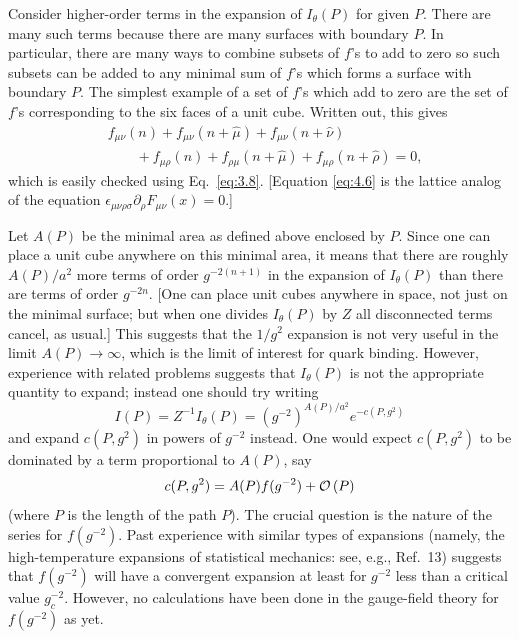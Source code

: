 Consider higher-order terms in the expansion of $I_{\theta}(P)$ for
given $P$.  There are many such terms because there are many surfaces
with boundary $P$.  In particular, there are many ways to combine subsets
of $f$'s to add to zero so such subsets can be added to any minimal sum
of $f$'s which forms a surface with boundary $P$.  The simplest example
of a set of $f$'s which add to zero are the set of $f$'s corresponding
to the six faces of a unit cube.  Written out, this gives
\begin{equation}
\begin{split}
&f_{\mu\nu}(n)+f_{\mu\nu}(n+\hat\mu)+f_{\mu\nu}(n+\hat\nu)\\
&\qquad + f_{\mu\rho}(n)+f_{\rho\mu}(n+\hat\mu)+f_{\mu\rho}(n+\hat\rho)=0,
\end{split}
\label{eq:4.6}
\end{equation}
which is easily checked using Eq.~\eqref{eq:3.8}.  [Equation
\eqref{eq:4.6} is the lattice analog of the equation
$\epsilon_{\mu\nu\rho\sigma}\partial_{\rho}F_{\mu\nu}(x)=0$.]

Let $A(P)$ be the minimal area as defined above enclosed by $P$.  Since
one can place a unit cube anywhere on this minimal area, it means that
there are roughly $A(P)/a^{2}$ more terms of order $g^{-2(n+1)}$ in the
expansion of $I_{\theta}(P)$ than there are terms of order $g^{-2n}$.
[One can place unit cubes anywhere in space, not just on the minimal
surface; but when one divides $I_{\theta}(P)$ by $Z$ all disconnected
terms cancel, as usual.]  This suggests that the $1/g^{2}$ expansion is
not very useful in the limit $A(P) \to \infty$, which is the limit of
interest for quark binding.  However, experience with related problems
suggests that $I_{\theta}(P)$ is not the appropriate quantity to expand;
instead one should try writing
\[
I(P) = Z^{-1}I_{\theta}(P) = (g^{-2})^{A(P)/a^{2}}e^{-c(P,g^{2})}
\]
and expand $c(P,g^{2})$ in powers of $g^{-2}$ instead.  One would expect
$c(P,g^{2})$ to be dominated by a term proportional to $A(P)$, say
\[
c(P,g^{2}) = A(P)f(g^{-2}) + \mathcal{O}\left(P\right)
\]
(where $P$ is the length of the path $P$).  The crucial question is the
nature of the series for $f(g^{-2})$.  Past experience with similar types
of expansions (namely, the high-temperature expansions of statistical
mechanics:  see, e.g., Ref.~13) suggests that $f(g^{-2})$ will have a
convergent expansion at least for $g^{-2}$ less than a critical value
$g_{c}^{-2}$.  However, no calculations have been done in the
gauge-field theory for $f(g^{-2})$ as yet.

